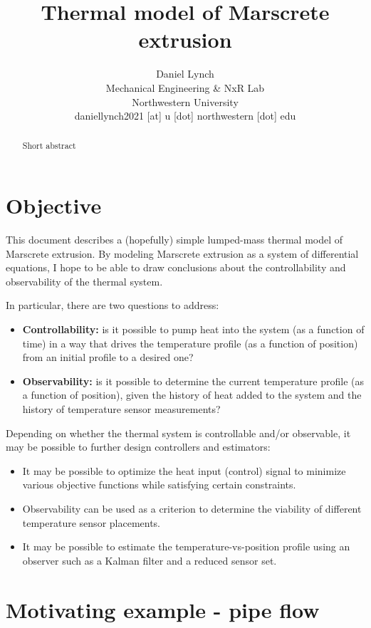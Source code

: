 \documentclass{article}
\title{Thermal model of Marscrete extrusion}
\author{Daniel Lynch\\
        Mechanical Engineering \& NxR Lab\\
        Northwestern University\\
        daniellynch2021 [at] u [dot] northwestern [dot] edu
        }
\begin{document}
\maketitle

\begin{abstract}
Short abstract
\end{abstract}

\tableofcontents

\section[Objective]{Objective}
This document describes a (hopefully) simple lumped-mass thermal model of Marscrete extrusion.
By modeling Marscrete extrusion as a system of differential equations, I hope to be able to draw conclusions about the controllability and observability of the thermal system.

In particular, there are two questions to address:
\begin{itemize}
\item \textbf{Controllability:} is it possible to pump heat into the system (as a function of time) in a way that drives the temperature profile (as a function of position) from an initial profile to a desired one?
\item \textbf{Observability:} is it possible to determine the current temperature profile (as a function of position), given the history of heat added to the system and the history of temperature sensor measurements?
\end{itemize}

Depending on whether the thermal system is controllable and/or observable, it may be possible to further design controllers and estimators:
\begin{itemize}
\item It may be possible to optimize the heat input (control) signal to minimize various objective functions while satisfying certain constraints.
\item Observability can be used as a criterion to determine the viability of different temperature sensor placements.
\item It may be possible to estimate the temperature-vs-position profile using an observer such as a Kalman filter and a reduced sensor set.
\end{itemize}

\section[Motivating example - pipe flow]{Motivating example - pipe flow}
\end{document}
